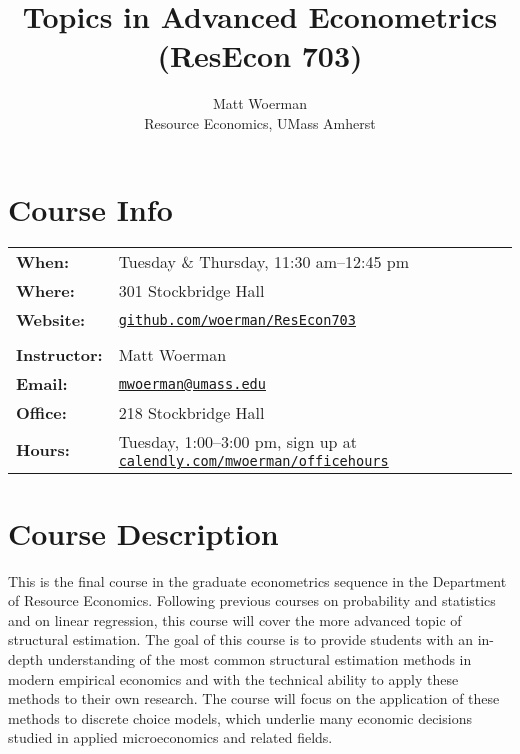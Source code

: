 \documentclass[11pt,letterpaper]{article}
\newcommand{\subtitle}[1]{%
	\posttitle{%
		\par\end{center}
	\begin{center}\large#1\end{center}
	\vskip0.5em}%
}
\begin{document}
\title{Topics in Advanced Econometrics (ResEcon 703)}
\subtitle{Fall 2021 Syllabus\vspace{-2ex}}
\author{Matt Woerman\\Resource Economics, UMass Amherst}
\date{\vspace{-5ex}}

\maketitle

\section*{Course Info}

\begin{tabular}{ll} 
	\textbf{When:} & Tuesday \& Thursday, 11:30 am--12:45 pm \\
	\textbf{Where:} & 301 Stockbridge Hall \\
	\textbf{Website:} & \href{https://github.com/woerman/ResEcon703}{\texttt{github.com/woerman/ResEcon703}} \\
	\\
	\textbf{Instructor:} & Matt Woerman \\
	\textbf{Email:} & \href{mailto:mwoerman@umass.edu}{\texttt{mwoerman@umass.edu}} \\
	\textbf{Office:} & 218 Stockbridge Hall \\
	\textbf{Hours:} & Tuesday, 1:00--3:00 pm, sign up at \href{https://calendly.com/mwoerman/officehours}{\texttt{calendly.com/mwoerman/officehours}}
\end{tabular} 

\section*{Course Description}

This is the final course in the graduate econometrics sequence in the Department of Resource Economics. Following previous courses on probability and statistics and on linear regression, this course will cover the more advanced topic of structural estimation. The goal of this course is to provide students with an in-depth understanding of the most common structural estimation methods in modern empirical economics and with the technical ability to apply these methods to their own research. The course will focus on the application of these methods to discrete choice models, which underlie many economic decisions studied in applied microeconomics and related fields.
\end{document}
